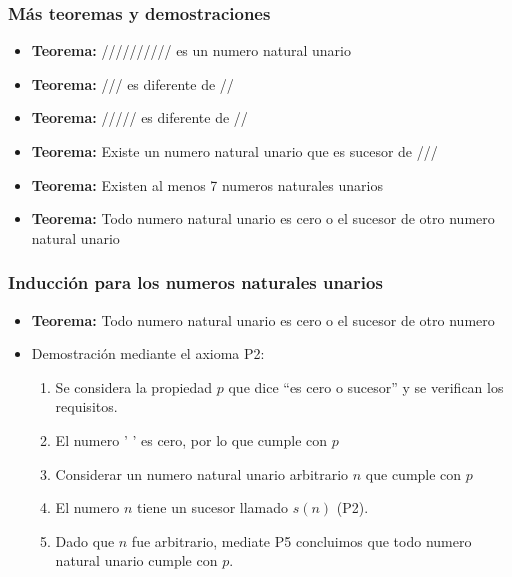 \documentclass{beamer}
\begin{document}
\begin{frame}
    \frametitle{M\'as teoremas y demostraciones}
    \begin{itemize}
        \item{{\bf Teorema: }////////// es un numero natural unario}
        \item{{\bf Teorema: }/// es diferente de //}
        \item{{\bf Teorema: }///// es diferente de //}
        \item{{\bf Teorema: }Existe un numero natural unario que es sucesor de ///}
        \item{{\bf Teorema: }Existen al menos 7 numeros naturales unarios}
        \item{{\bf Teorema: }Todo numero natural unario es cero o el sucesor de otro
        numero natural unario}
    \end{itemize}
\end{frame}

\begin{frame}
    \frametitle{Inducci\'on para los numeros naturales unarios}
    \begin{itemize}
        \item{{\bf Teorema: }Todo numero natural unario es cero o el sucesor de
        otro numero}
        \item{Demostraci\'on mediante el axioma P2:
        \begin{enumerate}
            \item{Se considera la propiedad $p$ que dice ``es cero o sucesor'' y se verifican los
            requisitos.}
            \item{El numero ' ' es cero, por lo que cumple con $p$}
            \item{Considerar un numero natural unario arbitrario $n$ que cumple con $p$}
            \item{El numero $n$ tiene un sucesor llamado $s(n)$ (P2).}
            \item{Dado que $n$ fue arbitrario, mediate P5 concluimos que todo
            numero natural unario cumple con $p$.}
        \end{enumerate}
        }
    \end{itemize}
\end{frame}
\end{document}
